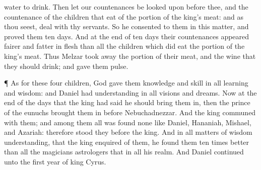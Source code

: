 {water to
drink.
Then let our
countenances be looked
upon
before thee, and the
countenance of the
children that
eat of the
portion of the
king’s
meat: and as thou
seest,
deal with thy
servants.
So he
consented to them in this
matter, and
proved them
ten
days.
And at the
end of
ten
days their
countenances
appeared
fairer and
fatter in
flesh than all the
children which did
eat the
portion of the
king’s
meat.
Thus
Melzar took
away the portion of their
meat, and the
wine that they should
drink; and
gave them
pulse.
\par }{\PP {}¶ As for these
four
children,
God
gave them
knowledge and
skill in all
learning and
wisdom: and
Daniel had
understanding in all
visions and
dreams.
Now at the
end of the
days that the
king had
said he should
bring them in, then the
prince of the
eunuchs
brought them in
before
Nebuchadnezzar.
And the
king
communed with them; and among them all was
found none like
Daniel,
Hananiah,
Mishael, and
Azariah: therefore
stood they
before the
king.
And in all
matters of
wisdom
{}
understanding, that the
king
enquired of them, he
found them ten
times
better than all the
magicians
{}
astrologers that
{} in all his
realm.
And
Daniel continued
{} unto the
first
year of
king
Cyrus.

}
